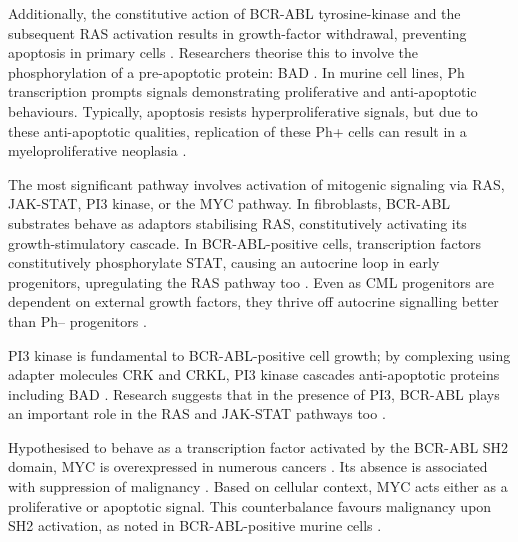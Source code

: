 Additionally, the constitutive action of BCR-ABL tyrosine-kinase and the subsequent RAS activation results in growth-factor withdrawal, preventing apoptosis in primary cells \citep{RefWorks:doc:5839a869e4b04961d35918bf}. Researchers theorise this to involve the phosphorylation of a pre-apoptotic protein: BAD \citep{RefWorks:doc:5839a9cbe4b066125b21237d}. In murine cell lines, Ph transcription prompts signals demonstrating proliferative and anti-apoptotic behaviours. Typically, apoptosis resists hyperproliferative signals, but due to these anti-apoptotic qualities, replication of these Ph+ cells can result in a myeloproliferative neoplasia \citep{RefWorks:doc:5839ab0ce4b027b9d4153445}.

The most significant pathway involves activation of mitogenic signaling via RAS, JAK-STAT, PI3 kinase, or the MYC pathway. In fibroblasts, BCR-ABL substrates behave as adaptors stabilising RAS, constitutively activating its growth-stimulatory cascade. In BCR-ABL-positive cells, transcription factors constitutively phosphorylate STAT, causing an autocrine loop in early progenitors, upregulating the RAS pathway too \citep{RefWorks:doc:5838793ee4b09a21e9385f89,RefWorks:doc:58387a54e4b066125b21013e,RefWorks:doc:58387761e4b066125b210070}. Even as CML progenitors are dependent on external growth factors, they thrive off autocrine signalling better than Ph-- progenitors \citep{RefWorks:doc:58387b12e4b066125b210151}.

PI3 kinase is fundamental to BCR-ABL-positive cell growth; by complexing using adapter molecules CRK and CRKL, PI3 kinase cascades anti-apoptotic proteins including BAD \citep{RefWorks:doc:5838823be4b066125b210264,RefWorks:doc:58388287e4b027b9d4151689}. Research suggests that in the presence of PI3, BCR-ABL plays an important role in the RAS and JAK-STAT pathways too \citep{RefWorks:doc:5838823be4b066125b210264}.

Hypothesised to behave as a transcription factor activated by the BCR-ABL SH2 domain, MYC is overexpressed in numerous cancers \citep{RefWorks:doc:5839a55ce4b027b9d41533c7}. Its absence is associated with suppression of malignancy \citep{RefWorks:doc:5839a55ce4b027b9d41533c7}. Based on cellular context, MYC acts either as a proliferative or apoptotic signal. This counterbalance favours malignancy upon SH2 activation, as noted in BCR-ABL-positive murine cells \citep{RefWorks:doc:5839a59ee4b09a21e9387fdd}.

